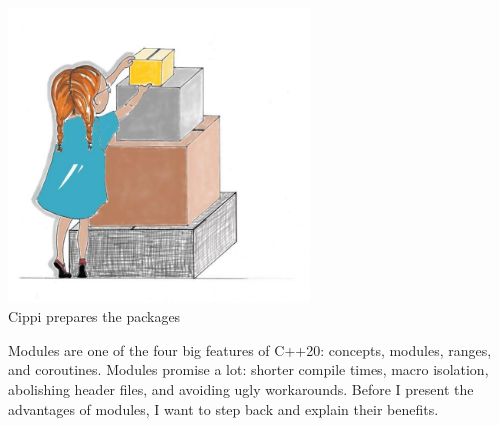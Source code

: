 

\begin{center}
\includegraphics[width=0.6\textwidth]{content/3/chapter4/images/11.png}\\
Cippi prepares the packages
\end{center}

Modules are one of the four big features of C++20: concepts, modules, ranges, and coroutines. Modules promise a lot: shorter compile times, macro isolation, abolishing header files, and avoiding ugly workarounds. Before I present the advantages of modules, I want to step back and explain their benefits.





























